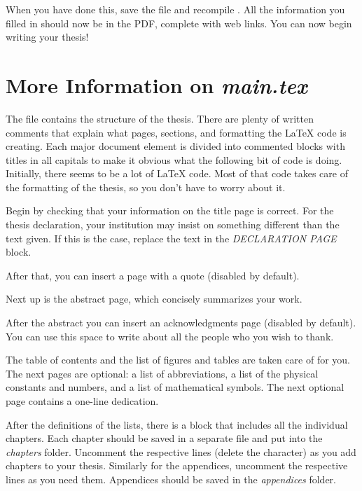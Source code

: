 When you have done this, save the file and recompile . All the information you filled in should now be in the PDF, complete with web links. You can now begin writing your thesis!


\section{More Information on \emph{main.tex}}

The  file contains the structure of the thesis. There are plenty of written comments that explain what pages, sections, and formatting the LaTeX code is creating. Each major document element is divided into commented blocks with titles in all capitals to make it obvious what the following bit of code is doing. Initially, there seems to be a lot of LaTeX code. Most of that code takes care of the formatting of the thesis, so you don't have to worry about it.

Begin by checking that your information on the title page is correct. For the thesis declaration, your institution may insist on something different than the text given. If this is the case, replace the text in the \emph{DECLARATION PAGE} block.

After that, you can insert a page with a quote (disabled by default).

Next up is the abstract page, which concisely summarizes your work.

After the abstract you can insert an acknowledgments page (disabled by default).
 You can use this space to write about all the people who you wish to thank.

The table of contents and the list of figures and tables are taken care of for you.%
The next pages are optional: a list of abbreviations, a list of the physical constants and numbers, and a list of mathematical symbols.
The next optional page contains a one-line dedication.

After the definitions of the lists, there is a block that includes all the individual chapters. Each chapter should be saved in a separate file and put into the \emph{chapters} folder. Uncomment the respective lines (delete the \code{\%} character) as you add chapters to your thesis. Similarly for the appendices, uncomment the respective lines as you need them. Appendices should be saved in the \emph{appendices} folder.

